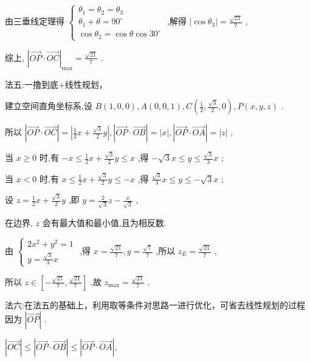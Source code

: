 \documentclass[10pt]{article}
\begin{document}
由三垂线定理得 \(\left\{  \begin{array}{l} {\theta }_{1} = {\theta }_{2} = {\theta }_{3} \\  {\theta }_{1} + \theta  = {90}^{ \circ  } \\  \cos {\theta }_{2} = \cos \theta \cos {30}^{ \circ  } \end{array}\right.\) ,解得 \(\left| {\cos {\theta }_{3}}\right|  = \frac{\sqrt{21}}{7}\) ,

综上, \({\left| \overrightarrow{OP} \cdot  \overrightarrow{OC}\right| }_{\max } = \frac{\sqrt{21}}{7}\) .

法五:一撸到底+线性规划，

建立空间直角坐标系,设 \(B\left( {1,0,0}\right) ,A\left( {0,0,1}\right) ,C\left( {\frac{1}{2},\frac{\sqrt{3}}{2},0}\right) ,P\left( {x,y,z}\right)\) .

所以 \(\left| {\overrightarrow{OP} \cdot  \overrightarrow{OC}}\right|  = \left| {\frac{1}{2}x + \frac{\sqrt{3}}{2}y}\right| ,\left| {\overrightarrow{OP} \cdot  \overrightarrow{OB}}\right|  = \left| x\right| ,\left| {\overrightarrow{OP} \cdot  \overrightarrow{OA}}\right|  = \left| z\right|\) ,

当 \(x \geq  0\) 时,有 \(- x \leq  \frac{1}{2}x + \frac{\sqrt{3}}{2}y \leq  x\) ,得 \(- \sqrt{3}x \leq  y \leq  \frac{\sqrt{3}}{3}x\) ;

当 \(x < 0\) 时,有 \(x \leq  \frac{1}{2}x + \frac{\sqrt{3}}{2}y \leq   - x\) ,得 \(\frac{\sqrt{3}}{3}x \leq  y \leq   - \sqrt{3}x\) ;

设 \(z = \frac{1}{2}x + \frac{\sqrt{3}}{2}y\) ,即 \(y = \frac{2}{\sqrt{3}}z - \frac{x}{\sqrt{3}}\) ,

在边界, \(z\) 会有最大值和最小值,且为相反数.

由 \(\left\{  \begin{array}{l} 2{x}^{2} + {y}^{2} = 1 \\  y = \frac{\sqrt{3}}{3}x \end{array}\right.\) ,得 \(x = \frac{\sqrt{21}}{7},y = \frac{\sqrt{7}}{7}\) ,所以 \({z}_{E} = \frac{\sqrt{21}}{7}\) ,

所以 \(z \in  \left\lbrack  {-\frac{\sqrt{21}}{7},\frac{\sqrt{21}}{7}}\right\rbrack\) ,故 \({z}_{\max } = \frac{\sqrt{21}}{7}\) .

法六:在法五的基础上，利用取等条件对思路一进行优化，可省去线性规划的过程因为 \(\left| \overrightarrow{OP}\right|\) .

\(\left| \overrightarrow{OC}\right|  \leq  \left| {\overrightarrow{OP} \cdot  \overrightarrow{OB}}\right|  \leq  \left| {\overrightarrow{OP} \cdot  \overrightarrow{OA}}\right| ,\)
\end{document}
